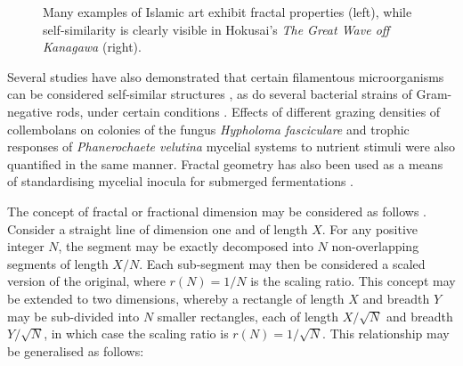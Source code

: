 \begin{figure}[bt]
	\centering
	\captionsetup[subfloat]{labelformat=empty}
	\hspace{0.5cm}
	\caption{Many examples of Islamic art exhibit fractal properties (left), while self-similarity is clearly visible in Hokusai's \emph{The Great Wave off Kanagawa} (right).}
	\label{fig:FractalArt}
\end{figure}

Several studies have also demonstrated that certain filamentous microorganisms can be considered self-similar structures \cite{papagianni2006b,cpark2007,jones1997,jckim2005,ryoo1999,hitchcock1996,golinski2008}, as do several bacterial strains of Gram-negative rods, under certain conditions \cite{matsuyama1992}. Effects of different grazing densities of collembolans on colonies of the fungus \emph{Hypholoma fasciculare} \cite{kampichler2004} and trophic responses of \emph{Phanerochaete velutina} mycelial systems to nutrient stimuli \cite{wells1998} were also quantified in the same manner. Fractal geometry has also been used as a means of standardising mycelial inocula for submerged fermentations \cite{jones1993a}.

The concept of fractal or fractional dimension may be considered as follows \cite{mandelbrot1967}. Consider a straight line of dimension one and of length $X$. For any positive integer $N$, the segment may be exactly decomposed into $N$ non-overlapping segments of length $X/N$. Each sub-segment may then be considered a scaled version of the original, where $r(N) = 1/N$ is the scaling ratio. This concept may be extended to two dimensions, whereby a rectangle of length $X$ and breadth $Y$ may be sub-divided into $N$ smaller rectangles, each of length $X/\sqrt{N}$ and breadth $Y/\sqrt{N}$, in which case the scaling ratio is $r(N) = 1/\sqrt{N}$. This relationship may be generalised as follows:

